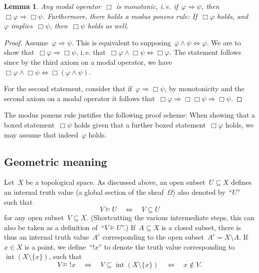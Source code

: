 \documentclass[10pt]{amsart}
\makeatletter
\theoremstyle{definition}
\theoremstyle{plain}
\newtheorem{lemma}[defn]{Lemma}
\theoremstyle{remark}
\DeclareMathOperator{\Int}{int}
\newcommand{\?}{\,{:}\,}
\renewcommand{\_}{\mathpunct{.}\,}
\newcommand{\notat}[1]{{!#1}}
\newcommand{\ie}{i.\,e.\@\xspace}
\makeatother
\begin{document}
\begin{lemma}Any modal operator~$\Box$ is monotonic, \ie if~$\varphi
\Rightarrow \psi$, then~$\Box\varphi \Rightarrow \Box\psi$. Furthermore, there
holds a modus ponens rule: If~$\Box\varphi$ holds, and~$\varphi$
implies~$\Box\psi$, then~$\Box\psi$ holds as well.\end{lemma}
\begin{proof}Assume~$\varphi \Rightarrow \psi$. This is equivalent to
supposing~$\varphi \wedge \psi \Leftrightarrow \varphi$. We are to show
that~$\Box\varphi \Rightarrow \Box\psi$, \ie that~$\Box\varphi \wedge
\Box\psi \Leftrightarrow \Box\varphi$. The statement follows since by the third
axiom on a modal operator, we have~$\Box\varphi \wedge \Box\psi \Leftrightarrow
\Box(\varphi \wedge \psi)$.

For the second statement, consider that if~$\varphi \Rightarrow \Box\psi$, by
monotonicity and the second axiom on a modal operator it follows
that~$\Box\varphi \Rightarrow \Box\Box\psi \Rightarrow \Box\psi$.
\end{proof}

The modus ponens rule justifies the following proof scheme: When showing
that a boxed statement~$\Box\psi$ holds given that a further boxed
statement~$\Box\varphi$ holds, we may assume that indeed~$\varphi$ holds.


\subsection{Geometric meaning} Let~$X$ be a topological space. As discussed
above, an open subset~$U \subseteq X$ defines an internal truth value (a global
section of the sheaf~$\Omega$) also
denoted by~``$U$'' such that
\[ V \models U \quad\Longleftrightarrow\quad V \subseteq U \]
for any open subset~$V \subseteq X$. (Shortcutting the various intermediate
steps, this can also be taken as a definition of~``$V \models U$''.)
If~$A \subseteq X$ is a closed subset, there is thus an internal truth
value~$A^c$ corresponding to the open subset~$A^c = X \setminus A$. If~$x \in
X$ is a point, we define~``$\notat{x}$'' to denote the truth value
corresponding to~$\Int(X \setminus \{x\})$, such that
\[ V \models \notat{x} \quad\Longleftrightarrow\quad V \subseteq \Int(X
\setminus \{ x \}) \quad\Longleftrightarrow\quad x \not\in V. \]
\end{document}

